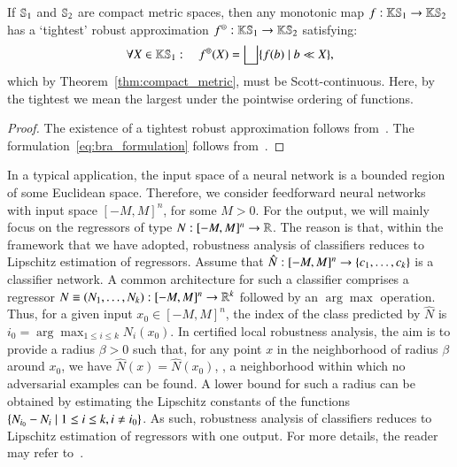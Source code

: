 \documentclass[11pt,times]{article}
\begin{document}
  \begin{corollary}
    \label{cor:tightest_robust_approximation}
    If $\mathbb{S}_1$ and $\mathbb{S}_2$ are compact metric spaces, then any
    monotonic map $f : \mathbb{K}\mathbb{S}_1 \to \mathbb{K}\mathbb{S}_2$ has a
    `tightest' robust approximation
    $f^\circledcirc : \mathbb{K}\mathbb{S}_1 \to \mathbb{K}\mathbb{S}_2$ satisfying:
    \begin{equation}
      \label{eq:bra_formulation}
      \forall X \in \mathbb{K}\mathbb{S}_1: \quad f^\circledcirc(X) = \bigsqcup
      \{{f(b)} \mid { b \ll X}\},
    \end{equation}
    \noindent
    which by Theorem~\ref{thm:compact_metric}, must be
    Scott-continuous. Here, by the tightest we mean the largest under the
    pointwise ordering of functions.
  \end{corollary}

  \begin{proof}
    The existence of a tightest robust approximation follows
    from~\parencite[Corollaries 4.4 and
    4.5]{Moggi_Farjudian_Duracz_Taha:Reachability_Hybrid:2018}. The
    formulation~\eqref{eq:bra_formulation} follows
    from~\parencite[Theorem~5.20]{Moggi_Farjudian_Duracz_Taha:Reachability_Hybrid:2018}.
  \end{proof}

    

  
\label{page:classifier_reduce_to_regressor}

  In a typical application, the input space of a neural network is a
  bounded region of some Euclidean space. Therefore, we consider
  feedforward neural networks with input space $[-M,M]^n$, for some
  $M>0$. For the output, we will mainly focus on the regressors of
  type $N : [-M,M]^n \to \mathbb{R}$. The reason is that, within the framework
  that we have adopted, robustness analysis of classifiers reduces to
  Lipschitz estimation of regressors. Assume that
  $\hat{N}: [-M,M]^n \to \left\{{c_1, \ldots, c_k}\right\}$ is a classifier
  network. A common architecture for such a classifier comprises a
  regressor $N \equiv (N_1, \ldots, N_k): [-M,M]^n \to \mathbb{R}^k$ followed
  by an $\arg \max$ operation. Thus, for a given input
  $x_0 \in [-M,M]^n$, the index of the class predicted by $\hat{N}$ is
  $i_0 = \arg \max_{1 \leq i \leq k} N_i(x_0)$. In certified local
  robustness analysis, the aim is to provide a radius $\beta > 0$ such
  that, for any point $x$ in the neighborhood of radius $\beta$ around
  $x_0$, we have $\hat{N}(x) = \hat{N}(x_0)$, {\ie}, a neighborhood
  within which no adversarial examples can be found. A lower bound for
  such a radius can be obtained by estimating the Lipschitz constants
  of the functions
  $\{{ N_{i_0} - N_i} \mid { 1 \leq i \leq k, i \neq i_0}\}$. As
  such, robustness analysis of classifiers reduces to Lipschitz
  estimation of regressors with one output. For more details, the
  reader may refer
  to~\parencite[Section~3]{Weng_et_al-CLEVER-ICLR:2018}.
\end{document}
